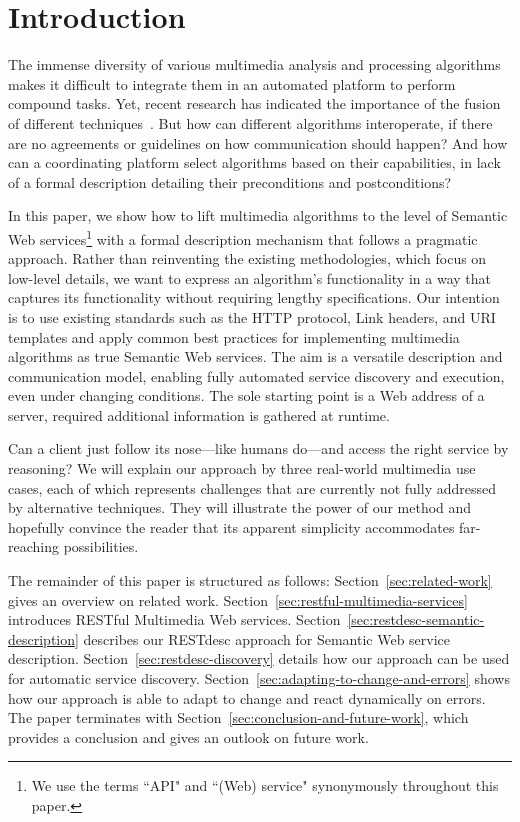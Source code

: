\documentclass[runningheads,a4paper, twocolumn]{llncs}
\begin{document}

\section{Introduction} \label{sec:introduction}
The immense diversity of various multimedia analysis and processing algorithms makes it difficult to integrate them in an automated platform to perform compound tasks. Yet, recent research has indicated the importance of the fusion of different techniques~\cite{Atrey:2010p3072}. But how can different algorithms interoperate, if there are no agreements or guidelines on how communication should happen? And how can a coordinating platform select algorithms based on their capabilities, in lack of a formal description detailing their preconditions and postconditions?

In this paper, we show how to lift multimedia algorithms to the level of Semantic Web services\footnote{We use the terms ``API" and ``(Web) service" synonymously throughout this paper.} with a formal description mechanism that follows a pragmatic approach. Rather than reinventing the existing methodologies, which focus on low-level details, we want to express an algorithm's functionality in a way that captures its functionality without requiring lengthy specifications. Our intention is to use existing standards such as the HTTP protocol, Link headers, and URI templates and apply common best practices for implementing multimedia algorithms as true Semantic Web services. The aim is a versatile description and communication model, enabling fully automated service discovery and execution, even under changing conditions. The sole starting point is a Web address of a server, required additional information is gathered at runtime.

Can a client just follow its nose---like humans do---and access the right service by reasoning? We will explain our approach by three real-world multimedia use cases, each of which represents challenges that are currently not fully addressed by alternative techniques. They will illustrate the power of our method and hopefully convince the reader that its apparent simplicity accommodates far-reaching possibilities.

The remainder of this paper is structured as follows: Section~\ref{sec:related-work} gives an overview on related work. Section~\ref{sec:restful-multimedia-services} introduces RESTful Multimedia Web services. Section~\ref{sec:restdesc-semantic-description} describes our RESTdesc approach for Semantic Web service description. Section~\ref{sec:restdesc-discovery} details how our approach can be used for automatic service discovery. Section~\ref{sec:adapting-to-change-and-errors} shows how our approach is able to adapt to change and react dynamically on errors. The paper terminates with Section~\ref{sec:conclusion-and-future-work}, which provides a conclusion and gives an outlook on future work.
\end{document}
